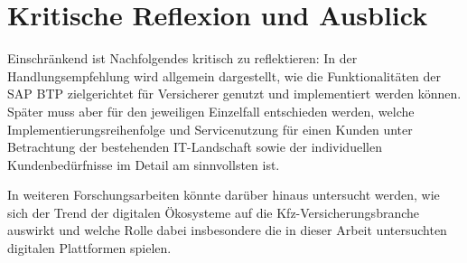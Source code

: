 \section{Kritische Reflexion und Ausblick}

Einschränkend ist Nachfolgendes kritisch zu reflektieren: In der Handlungsempfehlung wird allgemein dargestellt, wie die Funktionalitäten der SAP BTP zielgerichtet für Versicherer genutzt und implementiert werden können. Später muss aber für den jeweiligen Einzelfall entschieden werden, welche Implementierungsreihenfolge und Servicenutzung für einen Kunden unter Betrachtung der bestehenden IT-Landschaft sowie der individuellen Kundenbedürfnisse im Detail am sinnvollsten ist.

In weiteren Forschungsarbeiten könnte darüber hinaus untersucht werden, wie sich der Trend der digitalen Ökosysteme auf die Kfz-Versicherungsbranche auswirkt und welche Rolle dabei insbesondere die in dieser Arbeit untersuchten digitalen Plattformen spielen.







